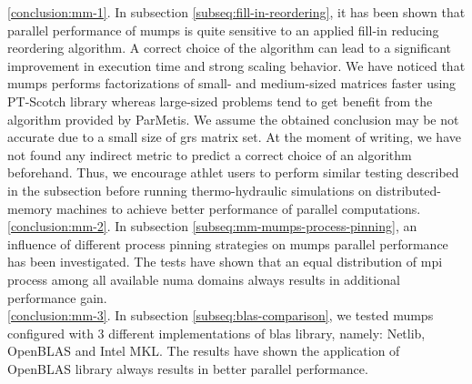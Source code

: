 \ref{conclusion:mm-1}. In subsection \ref{subseq:fill-in-reordering}, it has been shown that parallel performance of \acrshort{mumps} is quite sensitive to an applied fill-in reducing reordering algorithm. A correct choice of the algorithm can lead to a significant improvement in execution time and strong scaling behavior. We have noticed that \acrshort{mumps} performs factorizations of small- and medium-sized matrices faster using PT-Scotch library whereas large-sized problems tend to get benefit from the algorithm provided by ParMetis. We assume the obtained conclusion may be not accurate due to a small size of \acrshort{grs} matrix set. At the moment of writing, we have not found any indirect metric to predict a correct choice of an algorithm beforehand. Thus, we encourage \acrshort{athlet} users to perform similar testing described in the subsection before running thermo-hydraulic simulations on distributed-memory machines to achieve better performance of parallel computations.\\




\ref{conclusion:mm-2}. In subsection \ref{subseq:mm-mumps-process-pinning}, an influence of different process pinning strategies on \acrshort{mumps} parallel performance has been investigated. The tests have shown that an equal distribution of \acrshort{mpi} process among all available \acrshort{numa} domains always results in additional performance gain.\\ %


\ref{conclusion:mm-3}. 
In subsection \ref{subseq:blas-comparison},
we tested \acrshort{mumps} configured with 3 different implementations of \acrshort{blas} library, namely: Netlib, OpenBLAS and Intel MKL. The results have shown the application of OpenBLAS library always results in better parallel performance.\\



